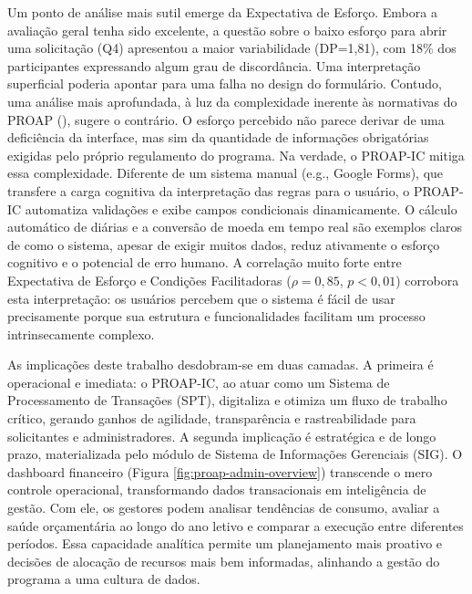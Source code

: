 \documentclass[portuguese]{sbc2025}%
\begin{document}
Um ponto de análise mais sutil emerge da Expectativa de Esforço. Embora a avaliação geral tenha sido excelente, a questão sobre o baixo esforço para abrir uma solicitação (Q4) apresentou a maior variabilidade (DP=1,81), com 18\% dos participantes expressando algum grau de discordância. Uma interpretação superficial poderia apontar para uma falha no design do formulário. Contudo, uma análise mais aprofundada, à luz da complexidade inerente às normativas do PROAP (\cite{CAPES2014}), sugere o contrário. O esforço percebido não parece derivar de uma deficiência da interface, mas sim da quantidade de informações obrigatórias exigidas pelo próprio regulamento do programa. Na verdade, o PROAP-IC mitiga essa complexidade. Diferente de um sistema manual (e.g., Google Forms), que transfere a carga cognitiva da interpretação das regras para o usuário, o PROAP-IC automatiza validações e exibe campos condicionais dinamicamente. O cálculo automático de diárias e a conversão de moeda em tempo real são exemplos claros de como o sistema, apesar de exigir muitos dados, reduz ativamente o esforço cognitivo e o potencial de erro humano. A correlação muito forte entre Expectativa de Esforço e Condições Facilitadoras ($\rho=0,85$, $p<0,01$) corrobora esta interpretação: os usuários percebem que o sistema é fácil de usar precisamente porque sua estrutura e funcionalidades facilitam um processo intrinsecamente complexo.

As implicações deste trabalho desdobram-se em duas camadas. A primeira é operacional e imediata: o PROAP-IC, ao atuar como um Sistema de Processamento de Transações (SPT), digitaliza e otimiza um fluxo de trabalho crítico, gerando ganhos de agilidade, transparência e rastreabilidade para solicitantes e administradores. A segunda implicação é estratégica e de longo prazo, materializada pelo módulo de Sistema de Informações Gerenciais (SIG). O dashboard financeiro (Figura \ref{fig:proap-admin-overview}) transcende o mero controle operacional, transformando dados transacionais em inteligência de gestão. Com ele, os gestores podem analisar tendências de consumo, avaliar a saúde orçamentária ao longo do ano letivo e comparar a execução entre diferentes períodos. Essa capacidade analítica permite um planejamento mais proativo e decisões de alocação de recursos mais bem informadas, alinhando a gestão do programa a uma cultura de dados.
\end{document}
